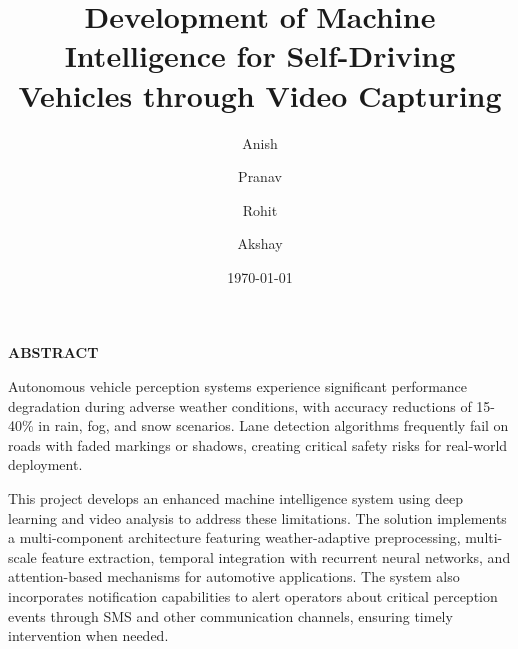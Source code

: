 \documentclass[12pt, a4paper]{report}
\begin{document}

\title{Development of Machine Intelligence for Self-Driving Vehicles through Video Capturing}
\author{
    Anish \and
    Pranav \and
    Rohit \and
    Akshay
}
\date{\today}
\maketitle

\tableofcontents
\newpage

\listoffigures
\newpage

\thispagestyle{empty}
\begin{center}
    \large\textbf{ABSTRACT}
\end{center}
\vspace{0.5cm}

\begin{doublespace}
Autonomous vehicle perception systems experience significant performance degradation during adverse weather conditions, with accuracy reductions of 15-40\% in rain, fog, and snow scenarios. Lane detection algorithms frequently fail on roads with faded markings or shadows, creating critical safety risks for real-world deployment.


This project develops an enhanced machine intelligence system using deep learning and video analysis to address these limitations. The solution implements a multi-component architecture featuring weather-adaptive preprocessing, multi-scale feature extraction, temporal integration with recurrent neural networks, and attention-based mechanisms for automotive applications. The system also incorporates notification capabilities to alert operators about critical perception events through SMS and other communication channels, ensuring timely intervention when needed.
\end{doublespace}
\clearpage








\singlespacing


\end{document}
